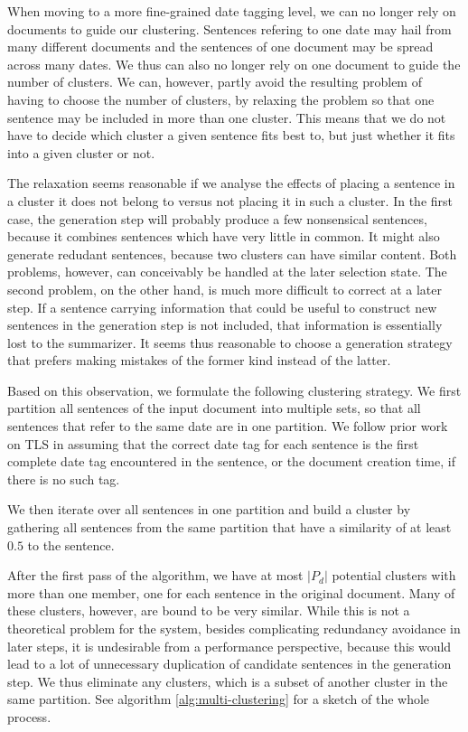 \documentclass[a4paper,BCOR=10mm]{report}
\begin{document}
When moving to a more fine-grained date tagging level, we can no longer rely on documents to guide our clustering. Sentences refering to one date may hail from many different documents and the sentences of one document may be spread across many dates.
We thus can also no longer rely on one document to guide the number of clusters. We can, however, partly avoid the resulting problem of having to choose the number of clusters, by relaxing the problem so that one sentence may be included in more than one cluster.
This means that we do not have to decide which cluster a given sentence fits best to, but just whether it fits into a given cluster or not.

The relaxation seems reasonable if we analyse the effects of placing a sentence in a cluster it does not belong to versus not placing it in such a cluster.
In the first case, the generation step will probably produce a few nonsensical sentences, because it combines sentences which have very little in common.
It might also generate redudant sentences, because two clusters can have similar content. Both problems, however, can conceivably be handled at the later selection state.
The second problem, on the other hand, is much more difficult to correct at a later step. If a sentence carrying information that could be useful to construct new sentences in the generation step is not included, that information is essentially lost to the summarizer. It seems thus reasonable to choose a generation strategy that prefers making mistakes of the former kind instead of the latter.

Based on this observation, we formulate the following clustering strategy. We first partition all sentences of the input document into multiple sets, so that all sentences that refer to the same date are in one partition. We follow prior work on TLS in assuming that the correct date tag for each sentence is the first complete date tag encountered in the sentence, or the document creation time, if there is no such tag.

We then iterate over all sentences in one partition and build a cluster by gathering all sentences from the same partition that have a similarity of at least $0.5$ to the sentence.

After the first pass of the algorithm, we have at most $|P_d|$ potential clusters with more than one member, one for each sentence in the original document.
Many of these clusters, however, are bound to be very similar. While this is not a theoretical problem for the system, besides complicating redundancy avoidance in later steps, it is undesirable from a performance perspective, because this would lead to a lot of unnecessary duplication of candidate sentences in the generation step.
We thus eliminate any clusters, which is a subset of another cluster in the same partition. See algorithm \ref{alg:multi-clustering} for a sketch of the whole process.
\end{document}
